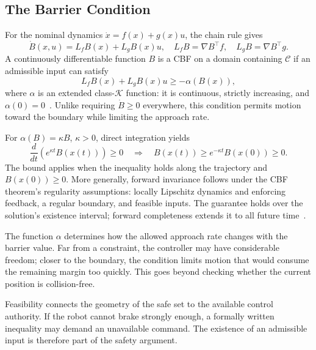 \subsection{The Barrier Condition}
For the nominal dynamics $\dot x=f(x)+g(x)u$, the chain rule gives
\begin{equation}
\dot B(x,u)=L_fB(x)+L_gB(x)u,
\quad L_fB=\nabla B^\top f,\quad L_gB=\nabla B^\top g.
\end{equation}
A continuously differentiable function $B$ is a CBF on a domain containing $\mathcal C$ if an admissible input can satisfy
\begin{equation}
L_fB(x)+L_gB(x)u\geq-\alpha(B(x)),
\label{eq:cbfcondition}
\end{equation}
where $\alpha$ is an extended class-$\mathcal K$ function: it is continuous, strictly increasing, and $\alpha(0)=0$~\cite{litAmes2017}. Unlike requiring $\dot B\geq0$ everywhere, this condition permits motion toward the boundary while limiting the approach rate.

For $\alpha(B)=\kappa B$, $\kappa>0$, direct integration yields
\begin{equation}
\frac{d}{dt}\left(e^{\kappa t}B(x(t))\right)\geq0
\quad\Longrightarrow\quad
B(x(t))\geq e^{-\kappa t}B(x(0))\geq0.
\end{equation}
The bound applies when the inequality holds along the trajectory and $B(x(0))\geq0$. More generally, forward invariance follows under the CBF theorem's regularity assumptions: locally Lipschitz dynamics and enforcing feedback, a regular boundary, and feasible inputs. The guarantee holds over the solution's existence interval; forward completeness extends it to all future time~\cite{litAmes2017}.

The function $\alpha$ determines how the allowed approach rate changes with the barrier value. Far from a constraint, the controller may have considerable freedom; closer to the boundary, the condition limits motion that would consume the remaining margin too quickly. This goes beyond checking whether the current position is collision-free.

Feasibility connects the geometry of the safe set to the available control authority. If the robot cannot brake strongly enough, a formally written inequality may demand an unavailable command. The existence of an admissible input is therefore part of the safety argument.

